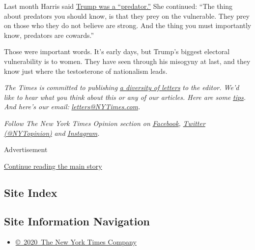 Last month Harris said
\href{https://www.usatoday.com/story/news/politics/elections/2019/07/03/kamala-harris-trump-predator/1644504001/}{Trump
was a ``predator.''} She continued: ``The thing about predators you
should know, is that they prey on the vulnerable. They prey on those who
they do not believe are strong. And the thing you must importantly know,
predators are cowards.''

Those were important words. It's early days, but Trump's biggest
electoral vulnerability is to women. They have seen through his misogyny
at last, and they know just where the testosterone of nationalism leads.

\emph{The Times is committed to publishing}
\href{https://www.nytimes3xbfgragh.onion/2019/01/31/opinion/letters/letters-to-editor-new-york-times-women.html}{\emph{a
diversity of letters}} \emph{to the editor. We'd like to hear what you
think about this or any of our articles. Here are some}
\href{https://help.nytimes3xbfgragh.onion/hc/en-us/articles/115014925288-How-to-submit-a-letter-to-the-editor}{\emph{tips}}\emph{.
And here's our email:}
\href{mailto:letters@NYTimes.com}{\emph{letters@NYTimes.com}}\emph{.}

\emph{Follow The New York Times Opinion section on}
\href{https://www.facebookcorewwwi.onion/nytopinion}{\emph{Facebook}}\emph{,}
\href{http://twitter.com/NYTOpinion}{\emph{Twitter (@NYTopinion)}}
\emph{and}
\href{https://www.instagram.com/nytopinion/}{\emph{Instagram}}\emph{.}

Advertisement

\protect\hyperlink{after-bottom}{Continue reading the main story}

\hypertarget{site-index}{%
\subsection{Site Index}\label{site-index}}

\hypertarget{site-information-navigation}{%
\subsection{Site Information
Navigation}\label{site-information-navigation}}

\begin{itemize}
\tightlist
\item
  \href{https://help.nytimes3xbfgragh.onion/hc/en-us/articles/115014792127-Copyright-notice}{©~2020~The
  New York Times Company}
\end{itemize}

